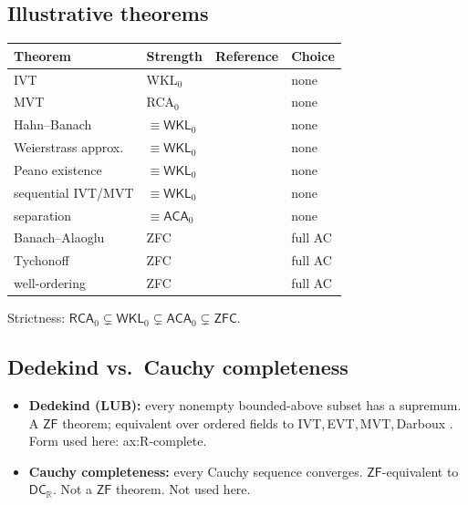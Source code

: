 \documentclass[11pt,reqno]{amsart}
\providecommand{\R}{\mathbb{R}}
\newcommand{\comma}{,\,\allowbreak}
\theoremstyle{redplain}
\begin{document}
\subsection{Illustrative theorems}

\bigskip
\begin{center}\small
	\begin{tabular}{|>{\raggedright\arraybackslash}m{4.5cm}|>{\centering\arraybackslash}m{2.5cm}|>{\centering\arraybackslash}m{3.2cm}|>{\centering\arraybackslash}m{1.3cm}|}
		\hline
		\textbf{Theorem} & \textbf{Strength} & \textbf{Reference} & \textbf{Choice} \\ \hline
		\textsf{IVT} & \textsf{WKL$_0$} & \cite{Simpson2009} & \textsf{none} \\ \hline
		\textsf{MVT} & \textsf{RCA$_0$} & \cite{HardinVelleman2001} & \textsf{none} \\ \hline
		\textsf{Hahn--Banach} & $\equiv\textsf{WKL}_0$ & \cite{Simpson2009} & \textsf{none} \\ \hline
		\textsf{Weierstrass approx.} & $\equiv\textsf{WKL}_0$ & \cite{Simpson2009} & \textsf{none} \\ \hline
		\textsf{Peano existence} & $\equiv\textsf{WKL}_0$ & \cite{Simpson2009} & \textsf{none} \\ \hline
		\textsf{sequential IVT/MVT} & $\equiv\textsf{WKL}_0$ & \cite{Sanders2020} & \textsf{none} \\ \hline
		\textsf{separation} & $\equiv\textsf{ACA}_0$ & \cite{Humphreys2015} & \textsf{none} \\ \hline
		\textsf{Banach--Alaoglu} & \textsf{ZFC} & \cite{Alaoglu1940} & \textsf{full AC} \\ \hline
		\textsf{Tychonoff} & \textsf{ZFC} & \cite{Kelley1950} & \textsf{full AC} \\ \hline
		\textsf{well-ordering} & \textsf{ZFC} & \cite{Jech1973} & \textsf{full AC} \\ \hline
	\end{tabular}
\end{center}

\noindent Strictness: $\textsf{RCA}_0\subsetneq\textsf{WKL}_0\subsetneq\textsf{ACA}_0\subsetneq\textsf{ZFC}$.

\subsection{Dedekind vs.\ Cauchy completeness}

\begin{itemize}
	\item \textbf{Dedekind (LUB):} every nonempty bounded-above subset has a supremum. A $\textsf{ZF}$ theorem; equivalent over ordered fields to IVT\comma EVT\comma MVT\comma Darboux \cite{Propp2012,Teismann2013}. Form used here: \textsf{ax:R-complete}.
	\item \textbf{Cauchy completeness:} every Cauchy sequence converges. $\textsf{ZF}$-equivalent to $\textsf{DC}_\R$. Not a $\textsf{ZF}$ theorem. Not used here.
\end{itemize}
\end{document}
